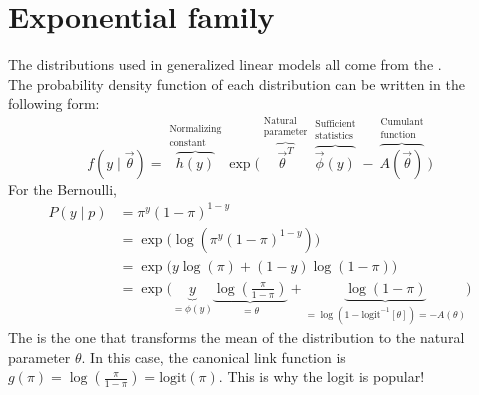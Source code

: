\documentclass[11pt]{article}
\newcommand{\logit}{\text{logit}}
\newcommand{\bgreen}[1]{\textbf{\color{olive}{#1}}}
\begin{document}
\section{Exponential family}
\label{exponentialFamily}
The distributions used in generalized linear models all come from the \bgreen{exponential family}. \\ The probability density function of each distribution can be written in the following form:
$$f(y\mid \vec\theta) = \overbrace{h(y)}^{\substack{\text{Normalizing}\\\text{constant}}} \exp\bigg(\overbrace{{\vec\theta}^T}^{\substack{\text{Natural}\\\text{parameter}}}\overbrace{\vec\phi(y)}^{\substack{\text{Sufficient}\\\text{statistics}}} - \overbrace{A\left(\vec\theta\right)}^{\substack{\text{Cumulant}\\\text{function}}}\bigg)$$
\bgreen{Ex.} For the Bernoulli,
$$\begin{aligned}
P(y\mid p) &= \pi^y(1-\pi)^{1-y} \\
&= \exp\bigg(\log\left(\pi^y(1-\pi)^{1-y}\right)\bigg) \\
&= \exp\bigg(y\log(\pi) + (1 - y)\log(1 - \pi)\bigg) \\
&= \exp\bigg(\underbrace{y}_{=\phi(y)}\underbrace{\log\left(\frac{\pi}{1-\pi}\right)}_{=\theta} + \underbrace{\log(1 - \pi)}_{=\log(1 - \logit^{-1}[\theta]) = -A(\theta)}\bigg)
\end{aligned}$$
The \bgreen{canonical link function} is the one that transforms the mean of the distribution to the natural parameter $\theta$. In this case, the canonical link function is $g(\pi) = \log\left(\frac{\pi}{1-\pi}\right) = \logit(\pi)$. This is why the logit is popular!
\end{document}
